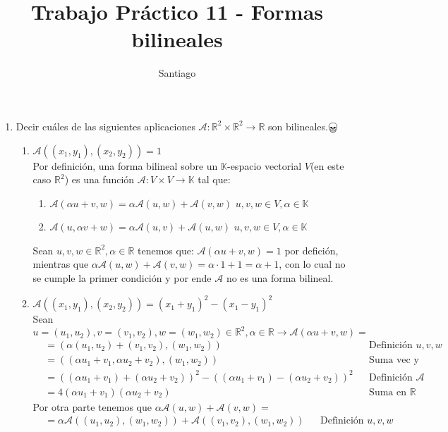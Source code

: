 \documentclass{article}
\title{Trabajo Práctico 11 - Formas bilineales }
\author{Santiago}
\date{}
\newcommand{\R}{\mathbb{R}}
\newcommand{\A}{\mathcal{A}}
\begin{document}
    \maketitle
    \begin{enumerate}
        \item Decir cuáles de las siguientes aplicaciones $\A :\R^2 \times \R^2\to \R$ son bilineales.$\bigskull$
            \begin{enumerate}
                \item $\A((x_1,y_1),(x_2,y_2))=1$\\
                    Por definición, una forma bilineal sobre un $\mathbb{K}$-espacio vectorial $V$(en este caso $\R^2$) es una función $\A:V\times V\to \mathbb{K}$ tal que:
                    \begin{enumerate}
                        \item $\A(\alpha u+v,w)=\alpha \A(u,w)+\A(v,w)$ \quad $ u,v,w\in V,\alpha \in \mathbb{K}$
                        \item $\A(u,\alpha v+w)=\alpha \A(u,v)+\A(u,w)$ \quad $ u,v,w\in V,\alpha \in \mathbb{K}$
                    \end{enumerate}
                    Sean $u,v,w\in \R^2, \alpha \in \R$ tenemos que: $\A(\alpha u+v,w)=1$ por defición, mientras que $\alpha \A(u,w)+\A(v,w)=\alpha \cdot 1 + 1=\alpha +1$, con lo cual no se cumple la primer condición y por ende $\A$ no es una forma bilineal.
                \item $\A((x_1,y_1),(x_2,y_2))=(x_1+y_1)^2-(x_1-y_1)^2$\\
                    Sean $u=(u_1,u_2),v=(v_1,v_2),w=(w_1,w_2)\in \R^2, \alpha \in \R\to \A(\alpha u+v,w)=$
                    \begin{align*}
                        &=(\alpha (u_1,u_2)+(v_1,v_2),(w_1,w_2)) &&\text{Definición $u,v,w$}\\
                        &=((\alpha u_1+v_1,\alpha u_2+v_2),(w_1,w_2)) &&\text{Suma vec y Producto por escalar}\\
                        &=((\alpha u_1+v_1)+(\alpha u_2+v_2))^2-((\alpha u_1+v_1)-(\alpha u_2+v_2))^2 &&\text{Definición } \A\\
                        &=4(\alpha u_1+v_1)(\alpha u_2+v_2) &&\text{Suma en }\R
                    \end{align*}
                    Por otra parte tenemos que $\alpha \A(u,w)+\A(v,w)=$
                    \begin{align*}
                        &=\alpha\A((u_1,u_2),(w_1,w_2))+\A((v_1,v_2),(w_1,w_2))&&\text{Definición }u,v,w\\

\end{align*}
\end{enumerate}
\end{enumerate}
\end{document}

